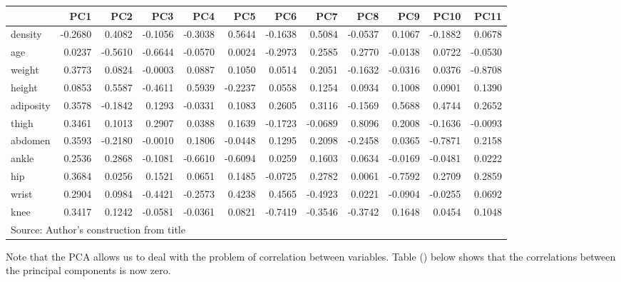 \documentclass[
]{article}
\begin{document}
\begin{table}
\caption{\label{tab:unnamed-chunk-5}Principal Components}
\begin{table}

\centering
\fontsize{12}{14}\selectfont
\begin{tabular}[t]{lrrrrrrrrrrr}
\toprule
  & PC1 & PC2 & PC3 & PC4 & PC5 & PC6 & PC7 & PC8 & PC9 & PC10 & PC11\\
\midrule
density & -0.2680 & 0.4082 & -0.1056 & -0.3038 & 0.5644 & -0.1638 & 0.5084 & -0.0537 & 0.1067 & -0.1882 & 0.0678\\
age & 0.0237 & -0.5610 & -0.6644 & -0.0570 & 0.0024 & -0.2973 & 0.2585 & 0.2770 & -0.0138 & 0.0722 & -0.0530\\
weight & 0.3773 & 0.0824 & -0.0003 & 0.0887 & 0.1050 & 0.0514 & 0.2051 & -0.1632 & -0.0316 & 0.0376 & -0.8708\\
height & 0.0853 & 0.5587 & -0.4611 & 0.5939 & -0.2237 & 0.0558 & 0.1254 & 0.0934 & 0.1008 & 0.0901 & 0.1390\\
adiposity & 0.3578 & -0.1842 & 0.1293 & -0.0331 & 0.1083 & 0.2605 & 0.3116 & -0.1569 & 0.5688 & 0.4744 & 0.2652\\
\addlinespace
thigh & 0.3461 & 0.1013 & 0.2907 & 0.0388 & 0.1639 & -0.1723 & -0.0689 & 0.8096 & 0.2008 & -0.1636 & -0.0093\\
abdomen & 0.3593 & -0.2180 & -0.0010 & 0.1806 & -0.0448 & 0.1295 & 0.2098 & -0.2458 & 0.0365 & -0.7871 & 0.2158\\
ankle & 0.2536 & 0.2868 & -0.1081 & -0.6610 & -0.6094 & 0.0259 & 0.1603 & 0.0634 & -0.0169 & -0.0481 & 0.0222\\
hip & 0.3684 & 0.0256 & 0.1521 & 0.0651 & 0.1485 & -0.0725 & 0.2782 & 0.0061 & -0.7592 & 0.2709 & 0.2859\\
wrist & 0.2904 & 0.0984 & -0.4421 & -0.2573 & 0.4238 & 0.4565 & -0.4923 & 0.0221 & -0.0904 & -0.0255 & 0.0692\\
\addlinespace
knee & 0.3417 & 0.1242 & -0.0581 & -0.0361 & 0.0821 & -0.7419 & -0.3546 & -0.3742 & 0.1648 & 0.0454 & 0.1048\\
\bottomrule
\multicolumn{12}{l}{\rule{0pt}{1em}Source: Author's construction from title}\\
\end{tabular}
\end{table}
\end{table}

Note that the PCA allows us to deal with the problem of correlation
between variables. Table () below shows that the correlations between
the principal components is now zero.
\end{document}
